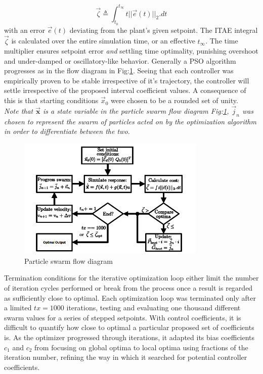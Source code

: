 \begin{equation}
\vec{\zeta}\triangleq\int_{t_0}^{t_\infty}t||\vec{e}(t)||_2.dt
\end{equation}
with an error $\vec{e}(t)$ deviating from the plant's given setpoint. The ITAE integral $\vec{\zeta}$ is calculated over the entire simulation time, or an effective $t_\infty$. The time multiplier ensures setpoint error \emph{and} settling time optimality, punishing overshoot and under-damped or oscillatory-like behavior. Generally a PSO algorithm progresses as in the flow diagram in Fig:\ref{fig:particle-diagram}. Seeing that each controller was empirically proven to be stable irrespective of it's trajectory, the controller will settle irrespective of the proposed interval coefficient values. A consequence of this is that starting conditions $\vec{x}_0$ were chosen to be a rounded set of unity.
\\
\emph{\color{Gray} Note that $\vec{\mathbf{x}}$ is a state variable in the particle swarm flow diagram Fig:\ref{fig:particle-diagram}, $\vec{j}_n$ was chosen to represent the swarm of particles acted on by the optimization algorithm in order to differentiate between the two.}
\\
\begin{figure}[htbp]
\centering
\includegraphics[width=0.8\textwidth]{figs/particle-diagram}\vspace{-12pt}
\caption{Particle swarm flow diagram}
\label{fig:particle-diagram}
\vspace{-18pt}
\end{figure}
\par
Termination conditions for the iterative optimization loop either limit the number of iteration cycles performed or break from the process once a result is regarded as sufficiently close to optimal. Each optimization loop was terminated only after a limited $tx=1000$ iterations, testing and evaluating one thousand different swarm values for a series of stepped setpoints. With control coefficients, it is difficult to quantify how close to optimal a particular proposed set of coefficients is. As the optimizer progressed through iterations, it adapted its bias coefficients $c_1$ and $c_2$ from focusing on global optima to local optima using fractions of the iteration number, refining the way in which it searched for potential controller coefficients.
